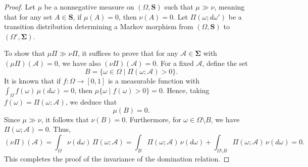 \begin{proof}
Let $\mu$ be a nonnegative measure on $(\Omega, \mathbf{S})$ such that $\mu \gg \nu$, meaning that for any set $A \in \mathbf{S}$, if $\mu(A)=0$, then $\nu(A)=0$. Let $\Pi(\omega; d\omega')$ be a transition distribution determining a Markov morphism from $(\Omega,\mathbf{S})$ to $(\Omega',\mathbf{\Sigma})$. 

To show that $\mu\Pi \gg \nu\Pi$, it suffices to prove that for any $\mathcal{A} \in \mathbf{\Sigma}$ with $(\mu \Pi)(\mathcal{A}) = 0$, we have also $(\nu \Pi)(\mathcal{A}) = 0$. For a fixed $\mathcal{A}$, define the set
\[
B = \{ \omega \in \Omega \mid \Pi(\omega; \mathcal{A}) > 0 \}.
\]
It is known that if $f: \Omega \to [0,1]$ is a measurable function with $\int_\Omega f(\omega)\, \mu(d\omega)=0$, then $\mu\{ \omega \mid f(\omega) > 0 \} = 0$. Hence, taking $f(\omega)=\Pi(\omega; \mathcal{A})$, we deduce that
\[
\mu(B)=0.
\]
Since $\mu \gg \nu$, it follows that $\nu(B)=0$. Furthermore, for $\omega \in \Omega \setminus B$, we have $\Pi(\omega; \mathcal{A}) = 0$. Thus,
\[
(\nu \Pi)(\mathcal{A}) = \int_{\Omega} \nu(d\omega) \, \Pi(\omega; \mathcal{A})
= \int_B \Pi(\omega; \mathcal{A}) \, \nu(d\omega) + \int_{\Omega \setminus B} \Pi(\omega; \mathcal{A}) \, \nu(d\omega) = 0.
\]
This completes the proof of the invariance of the domination relation.
\end{proof}

